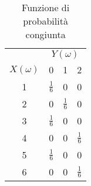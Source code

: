 \begin{center}
	\begin{table}[H]
		\begin{center}
			\begin{tabular}{|c|ccc|}
				\hline
				            & \multicolumn{3}{c|}{$Y(\omega)$}                                   \\
				$X(\omega)$ & 0                                & 1             & 2               \\
				\hline
				1           & $\frac{1}{6}$                    & 0             & 0               \\
				2           & 0                                & $\frac{1}{6}$ & 0               \\
				3           & $\frac{1}{6}$                    & 0             & 0               \\
				4           & 0                                & 0             & $\frac{1}{6}$   \\
				5           & $\frac{1}{6}$                    & 0             & 0               \\
				6           & 0                                & 0             & $ \frac{1}{6} $ \\
				\hline
			\end{tabular}
		\end{center}
		\caption{Funzione di probabilità congiunta}
	\end{table}
\end{center}

